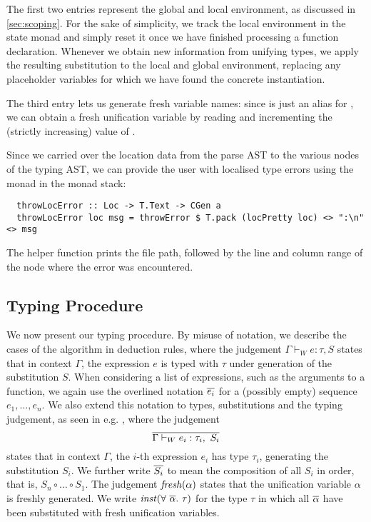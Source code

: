 The first two entries represent the global and local environment, as discussed
in \cref{sec:scoping}. For the sake of simplicity, we track the local
environment in the state monad and simply reset it once we have finished
processing a function declaration.
Whenever we obtain new information from unifying types, we apply the resulting
substitution to the local and global environment, replacing any placeholder
variables for which we have found the concrete instantiation.

The third entry lets us generate fresh variable names: since  is
just an alias for , we can obtain a fresh unification variable by
reading and incrementing the (strictly increasing) value of .

Since we carried over the location data from the parse AST to the various nodes
of the typing AST, we can provide the user with localised type errors using the
 monad in the  monad stack:
\begin{verbatim}
  throwLocError :: Loc -> T.Text -> CGen a
  throwLocError loc msg = throwError $ T.pack (locPretty loc) <> ":\n" <> msg
\end{verbatim}
%
The helper function  prints the file path, followed by the line
and column range of the node where the error was encountered.


\subsection{Typing Procedure}

We now present our typing procedure. By misuse of notation, we describe
the cases of the algorithm in deduction rules, where the judgement
$\Gamma \vdash_W e : \tau, S$ states that in context $\Gamma$, the expression $e$
is typed with $\tau$ under generation of the substitution $S$.
When considering a list of expressions, such as the arguments to a function, we
again use the overlined notation $\overline{e_i}$ for a (possibly empty) sequence
$e_1,\dots,e_n$. We also extend this notation to types, substitutions and the
typing judgement, as seen in e.g. , where the judgement
\[ \overline{ \Gamma \vdash_W e_i : \tau_i,\ S_i } \]
states that in context $\Gamma$, the $i$-th expression $e_i$ has type $\tau_i$,
generating the substitution $S_i$.
We further write $\overline{S_i}$ to mean the composition of all $S_i$ in order, that
is, $S_n \circ \dots \circ S_1$.
%
The judgement $\mathit{fresh}(\alpha)$ states that the unification variable $\alpha$ is
freshly generated.
We write $\inst(\forall\ \set{\alpha}.\ \tau)$ for the type $\tau$ in which
all $\overline{\alpha}$ have been substituted with fresh unification variables.

